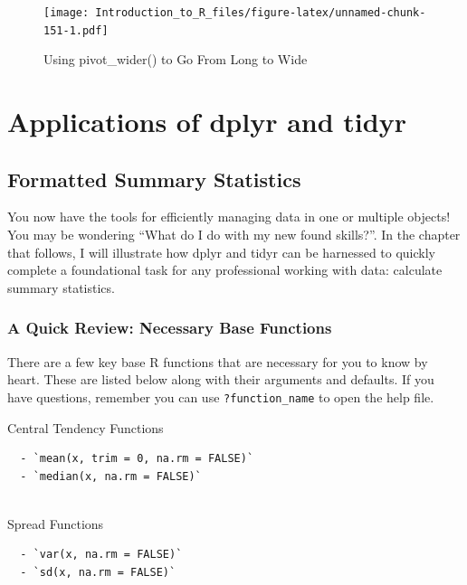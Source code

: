 \documentclass[]{book}
\theoremstyle{definition}
\theoremstyle{definition}
\theoremstyle{definition}
\theoremstyle{remark}
\begin{document}
\begin{figure}
\centering
\texttt{[image: Introduction\_to\_R\_files/figure-latex/unnamed-chunk-151-1.pdf]}
\caption{\label{fig:unnamed-chunk-151}Using pivot\_wider() to Go From Long to Wide}
\end{figure}

\hypertarget{part-applications-of-dplyr-and-tidyr}{%
\part{Applications of dplyr and tidyr}\label{part-applications-of-dplyr-and-tidyr}}

\hypertarget{formatted-summary-statistics}{%
\chapter{Formatted Summary Statistics}\label{formatted-summary-statistics}}

You now have the tools for efficiently managing data in one or multiple objects! You may be wondering ``What do I do with my new found skills?''. In the chapter that follows, I will illustrate how dplyr and tidyr can be harnessed to quickly complete a foundational task for any professional working with data: calculate summary statistics.

\hypertarget{a-quick-review-necessary-base-functions}{%
\section{A Quick Review: Necessary Base Functions}\label{a-quick-review-necessary-base-functions}}

There are a few key base R functions that are necessary for you to know by heart. These are listed below along with their arguments and defaults. If you have questions, remember you can use \texttt{?function\_name} to open the help file.

Central Tendency Functions

\begin{verbatim}
  - `mean(x, trim = 0, na.rm = FALSE)`
  - `median(x, na.rm = FALSE)`
  
\end{verbatim}

Spread Functions

\begin{verbatim}
  - `var(x, na.rm = FALSE)`
  - `sd(x, na.rm = FALSE)`
  
\end{verbatim}
\end{document}
